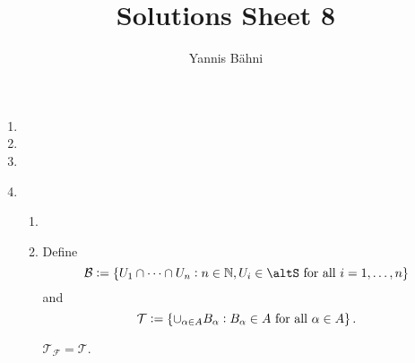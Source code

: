 

\title{Solutions Sheet 8}
\author{Yannis B\"{a}hni}
\address[Yannis B\"{a}hni]{University of Zurich, R\"{a}mistrasse 71, 8006 Zurich}



\maketitle
\thispagestyle{fancy}

\setcounter{section}{1}

\begin{enumerate}[label = \textbf{Exercise \arabic*.},wide = 0pt, itemsep = 1.5ex]
	\item
	\item
	\item
	\item
		~
		\begin{enumerate}[label = \textbf{\alph*.},wide = 0pt, itemsep = 1.5ex]
			\item 
			\item Define
				\begin{equation*}
					\mathcal{B} := \cbr{U_1 \cap \dots \cap U_n : n \in \mathbb{N},U_i \in \mathcal{\altS} \text{ for all } i = 1,\dots,n}
				\end{equation*}
				\noindent and 
				\begin{equation*}
					\mathcal{T} := \cbr{\textstyle{\cup}_{\alpha \in A} B_\alpha : B_\alpha \in A \text{ for all } \alpha \in A}.
				\end{equation*}
		
				\begin{lemma}
					$\mathcal{T}_\mathcal{F} = \mathcal{T}$.
				\end{lemma}


\end{enumerate}
\end{enumerate}
